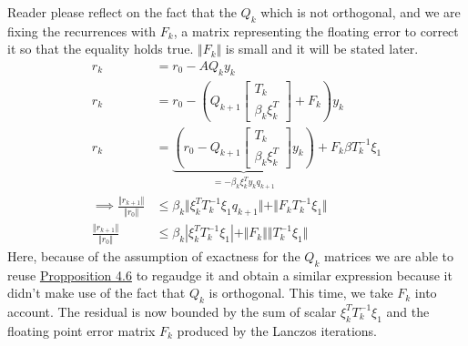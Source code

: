 \documentclass[]{article}
\theoremstyle{definition}
\begin{document}
            Reader please reflect on the fact that the $Q_k$ which is not orthogonal, and we are fixing the recurrences with $F_k$, a matrix representing the floating error to correct it so that the equality holds true. $\Vert F_k\Vert$ is small and it will be stated later.  
            \begin{align}
                r_k &= r_0 - AQ_ky_k
                \\
                r_k &= r_0 - 
                    \left(
                        Q_{k + 1} \begin{bmatrix}
                            T_k
                            \\
                            \beta_k \xi_k^T
                        \end{bmatrix}
                        + 
                        F_k
                    \right)
                y_k
                \\
                r_k &= 
                \underbrace{\left(
                    r_0 - Q_{k + 1}\begin{bmatrix}
                        T_k
                        \\
                        \beta_k \xi_k^T
                    \end{bmatrix}y_k
                \right)}_{= -\beta_k\xi_k^Ty_kq_{k + 1}} + F_k \beta T_k^{-1}\xi_1
                \\
                \implies
                \frac{\Vert r_{k + 1}\Vert}
                {
                    \Vert r_0\Vert
                } &\le
                \beta_k \Vert
                    \xi_k^T T_k^{-1}\xi_1 q_{k + 1}
                \Vert + 
                \Vert F_kT_k^{-1}\xi_1 \Vert
                \\
                \frac{\Vert r_{k + 1}\Vert}
                {
                    \Vert r_0\Vert
                } 
                &\le 
                \beta_k |
                    \xi_k^T T_k^{-1}\xi_1
                | + 
                \Vert F_k\Vert  \Vert T_k^{-1}\xi_1\Vert
            \end{align}
            Here, because of the assumption of exactness for the $Q_k$ matrices we are able to reuse \hyperref[prop:Lanczos_Vectors_and_Residuals]{Propposition 4.6} to regaudge it and obtain a similar expression because it didn't make use of the fact that $Q_k$ is orthogonal. This time, we take $F_k$ into account. The residual is now bounded by the sum of scalar $\xi_k^T T_k^{-1}\xi_1$ and the floating point error matrix $F_k$ produced by the Lanczos iterations. 
\end{document}
